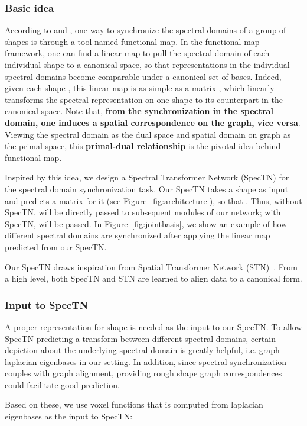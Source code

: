\documentclass[10pt,twocolumn,letterpaper]{article}
\begin{document}
\subsubsection{Basic idea} According to \cite{ovsjanikov2012functional} and \cite{wang2013image}, one way to synchronize the spectral domains of a group of shapes is through a tool named functional map. In the functional map framework, one can find a linear map to pull the spectral domain of each individual shape to a canonical space, so that representations in the individual spectral domains become comparable under a canonical set of bases. Indeed, given each shape , this linear map is as simple as a matrix , which linearly transforms the spectral representation  on one shape to its counterpart  in the canonical space. Note that, {\bf from the synchronization in the spectral domain, one induces a spatial correspondence on the graph, vice versa}. Viewing the spectral domain as the dual space and spatial domain on graph as the primal space, this {\bf primal-dual relationship} is the pivotal idea behind functional map.

Inspired by this idea, we design a Spectral Transformer Network (SpecTN) for the spectral domain synchronization task. Our SpecTN takes a shape  as input and predicts a matrix  for it (see Figure~\ref{fig:architecture}), so that
.
Thus, without SpecTN,  will be directly passed to subsequent modules of our network; with SpecTN,  will be passed. In Figure~\ref{fig:jointbasis}, we show an example of how different spectral domains are synchronized after applying the linear map  predicted from our SpecTN.


Our SpecTN draws inspiration from Spatial Transformer Network (STN)~\cite{jaderberg2015spatial}. From a high level, both SpecTN and STN are learned to align data to a canonical form.

\subsubsection{Input to SpecTN}
A proper representation for shape  is needed as the input to our SpecTN. To allow SpecTN predicting a transform between different spectral domains, certain depiction about the underlying spectral domain is greatly helpful, i.e. graph laplacian eigenbases in our setting. In addition, since spectral synchronization couples with graph alignment, providing rough shape graph correspondences could facilitate good prediction. 

Based on these, we use voxel functions  that is computed from laplacian eigenbases as the input to SpecTN:
\end{document}
